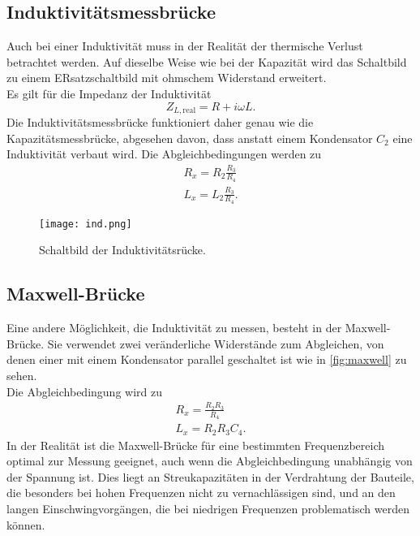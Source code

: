 \subsection{Induktivitätsmessbrücke}
    Auch bei einer Induktivität muss in der Realität der thermische Verlust betrachtet werden. Auf dieselbe Weise wie bei der Kapazität 
    wird das Schaltbild zu einem ERsatzschaltbild mit ohmschem Widerstand erweitert.\\
    Es gilt für die Impedanz der Induktivität
    \begin{equation}
        Z_{L, \text{real}} = R + i \omega L.
    \end{equation}
    Die Induktivitätsmessbrücke funktioniert daher genau wie die Kapazitätsmessbrücke, abgesehen davon, dass anstatt einem Kondensator $C_2$ 
    eine Induktivität verbaut wird. Die Abgleichbedingungen werden zu 
    \begin{align}
        R_x = R_2 \frac{R_3}{R_4}\\
        L_x = L_2 \frac{R_3}{R_4} .
    \end{align} 

    \begin{figure}
        \texttt{[image: ind.png]}
        \centering
        \caption{Schaltbild der Induktivitätsrücke.}
        \label{fig:ind}
    \end{figure}

\subsection{Maxwell-Brücke}
    Eine andere Möglichkeit, die Induktivität zu messen, besteht in der Maxwell-Brücke. Sie verwendet zwei veränderliche Widerstände zum Abgleichen,
    von denen einer mit einem Kondensator parallel geschaltet ist wie in \ref{fig:maxwell} zu sehen.\\
    Die Abgleichbedingung wird zu 
    \begin{align}
        R_x = \frac{R_2 R_3}{R_4}\\
        L_x = R_2 R_3 C_4 .
    \end{align}
    In der Realität ist die Maxwell-Brücke für eine bestimmten Frequenzbereich optimal zur Messung geeignet, auch wenn die Abgleichbedingung unabhängig
    von der Spannung ist. Dies liegt an Streukapazitäten in der Verdrahtung der Bauteile, die besonders bei hohen Frequenzen nicht zu vernachlässigen sind, 
    und an den langen Einschwingvorgängen, die bei niedrigen Frequenzen problematisch werden können.

